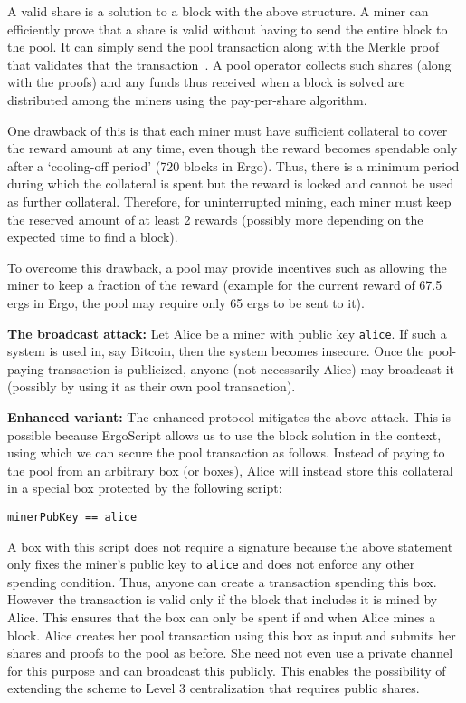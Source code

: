 \documentclass[runningheads]{llncs}
\newcommand{\authnote}[2]{\marginpar{\parbox{\marginparwidth}{\tiny %
  \textsf{#1 {\textcolor{blue}{notes: #2}}}}}%
  \textcolor{blue}{\textbf{\dag}}}
\newcommand{\authnote}[2]{
  \textsf{#1 \textcolor{blue}{: #2}}}
\newcommand{\authnote}[2]{}
\newcommand{\snote}[1]{{\authnote{\textcolor{red}{Scalahub notes}}{#1}}}
\newcommand{\langname}{ErgoScript\xspace}
\begin{document}

A valid share is a solution to a block with the above structure. A miner can efficiently prove that a share is valid without having to send the entire block to the pool. It can simply send the pool transaction along with the Merkle proof that validates that the transaction~\cite{Hearn:2012:BIP}.
A pool operator collects such shares (along with the proofs) and any funds thus received when a block is solved are distributed among the miners using the pay-per-share algorithm. 

One drawback of this is that each miner must have sufficient collateral to cover the reward amount at any time, even though the reward becomes spendable only after a `cooling-off period' (720 blocks in Ergo). Thus, there is a minimum period during which the collateral is spent but the reward is locked and cannot be used as further collateral. 
Therefore, for uninterrupted mining, each miner must keep the reserved amount of at least 2 rewards (possibly more depending on the expected time to find a block).

 To overcome this drawback, a pool may provide incentives such as allowing the miner to keep a fraction of the reward (example for the current reward of 67.5 ergs in Ergo, the pool may require only 65 ergs to be sent to it). 

\textbf{The broadcast attack:} Let Alice be a miner with public key \texttt{alice}. If such a system is used in, say Bitcoin, then the system becomes insecure. Once the pool-paying transaction is publicized, anyone (not necessarily Alice) may broadcast it (possibly by using it as their own pool transaction). 

\textbf{Enhanced variant:} The enhanced protocol mitigates the above attack. This is possible because \langname allows us to use the block solution in the context, using which we can secure the pool transaction as follows. Instead of paying to the pool from an arbitrary box (or boxes), Alice will instead store this collateral in a special box protected by the following script:
\begin{verbatim}
minerPubKey == alice
\end{verbatim}

A box with this script does not require a signature because the above statement only fixes the miner's public key to \texttt{alice} and does not enforce any other spending condition. Thus, anyone can create a transaction spending this box. However the transaction is valid only if the block that includes it is mined by Alice. 
This ensures that the box can only be spent if and when Alice mines a block.  
Alice creates her pool transaction using this box as input and submits her shares and proofs to the pool as before. She need not even use a private channel for this purpose and can broadcast this publicly. This enables the possibility of extending the scheme to Level 3 centralization that requires public shares.
\end{document}
